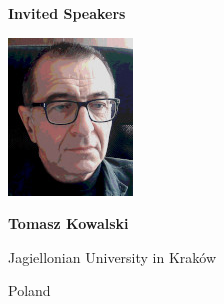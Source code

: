 \documentclass[a3paper, 12pt]{article}
\newcommand*\nfont{\fontsize{16}{19}\selectfont}
\begin{document}
\hfill
\begin{minipage}[t]{.43\linewidth}
  \nfont%
  \hfill {\Large \bf Invited Speakers}

  \medskip

  \begin{minipage}{.2\linewidth}
    \includegraphics[width=\linewidth, trim=0 0 0 0, clip]{kowalski}
  \end{minipage}
  \hfill
  \begin{minipage}{.75\linewidth}
    \textbf{Tomasz Kowalski}

    Jagiellonian University in Kraków

    Poland
  \end{minipage}

  \medskip

  

\end{minipage}
\end{document}
